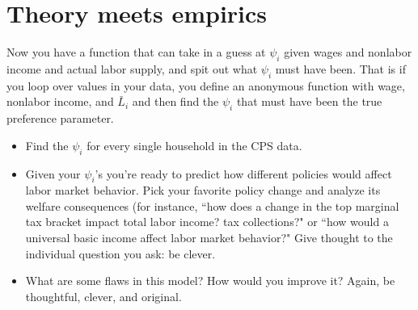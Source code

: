 \documentclass[11pt]{article}
\begin{document}
\section*{Theory meets empirics}
Now you have a function that can take in a guess at $\psi_i$ given wages and nonlabor income and actual labor supply, and spit out what $\psi_i$ must have been.  That is if you loop over values in your data, you define an anonymous function with wage, nonlabor income, and $\bar{L}_i$ and then find the $\psi_i$ that must have been the true preference parameter.
\begin{itemize}
\item  Find the $\psi_i$ for every single household in the CPS data.  
\item Given your $\psi_i$'s you're ready to predict how different policies would affect labor market behavior.  Pick your favorite policy change and analyze its welfare consequences (for instance, ``how does a change in the top marginal tax bracket impact total labor income? tax collections?"  or ``how would a universal basic income affect labor market behavior?"  Give thought to the individual question you ask: be clever.
\item What are some flaws in this model?  How would you improve it?  Again, be thoughtful, clever, and original.
\end{itemize}
\end{document}
